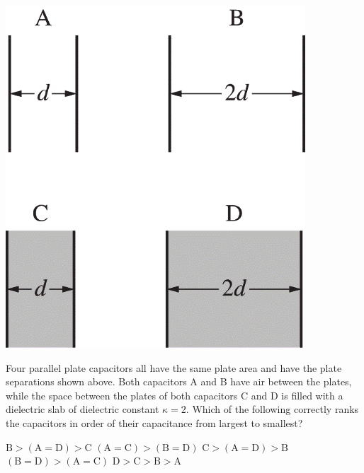 
\begin{center}
    \includegraphics[scale=0.4]{images/img-007-008.png}
\end{center}

\begin{questions}
\setcounter{question}{14}

\question
Four parallel plate capacitors all have the same plate area and have the plate separations shown above. Both capacitors A and B have air between the plates, while the space between the plates of both capacitors C and D is filled with a dielectric slab of dielectric constant $\kappa=2$. Which of the following correctly ranks the capacitors in order of their capacitance from largest to smallest?

\begin{choices}
    \choice $\mathrm{B}>(\mathrm{A}=\mathrm{D})>\mathrm{C}$
    \choice $(\mathrm{A}=\mathrm{C})>(\mathrm{B}=\mathrm{D})$
    \choice $\mathrm{C}>(\mathrm{A}=\mathrm{D})>\mathrm{B}$
    \choice $(\mathrm{B}=\mathrm{D})>(\mathrm{A}=\mathrm{C})$
    \choice $\mathrm{D}>\mathrm{C}>\mathrm{B}>\mathrm{A}$
\end{choices}

\end{questions}
